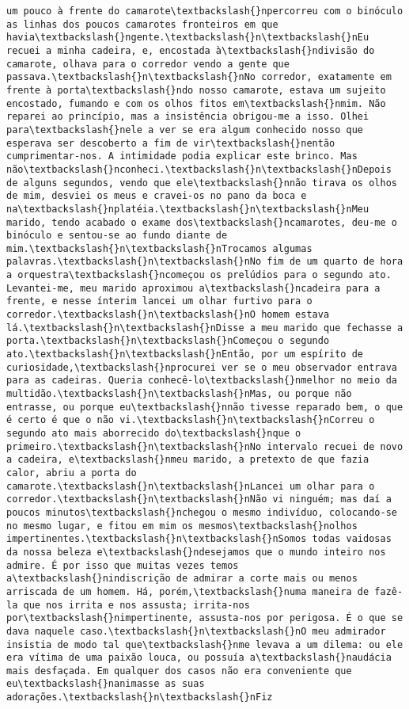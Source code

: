 \documentclass[11pt]{article}
\begin{document}
\begin{Verbatim}[commandchars=\\\{\}]
um pouco à frente do camarote\textbackslash{}npercorreu com o binóculo as linhas dos poucos camarotes fronteiros em que havia\textbackslash{}ngente.\textbackslash{}n\textbackslash{}nEu recuei a minha cadeira, e, encostada à\textbackslash{}ndivisão do camarote, olhava para o corredor vendo a gente que passava.\textbackslash{}n\textbackslash{}nNo corredor, exatamente em frente à porta\textbackslash{}ndo nosso camarote, estava um sujeito encostado, fumando e com os olhos fitos em\textbackslash{}nmim. Não reparei ao princípio, mas a insistência obrigou-me a isso. Olhei para\textbackslash{}nele a ver se era algum conhecido nosso que esperava ser descoberto a fim de vir\textbackslash{}nentão cumprimentar-nos. A intimidade podia explicar este brinco. Mas não\textbackslash{}nconheci.\textbackslash{}n\textbackslash{}nDepois de alguns segundos, vendo que ele\textbackslash{}nnão tirava os olhos de mim, desviei os meus e cravei-os no pano da boca e na\textbackslash{}nplatéia.\textbackslash{}n\textbackslash{}nMeu marido, tendo acabado o exame dos\textbackslash{}ncamarotes, deu-me o binóculo e sentou-se ao fundo diante de mim.\textbackslash{}n\textbackslash{}nTrocamos algumas palavras.\textbackslash{}n\textbackslash{}nNo fim de um quarto de hora a orquestra\textbackslash{}ncomeçou os prelúdios para o segundo ato. Levantei-me, meu marido aproximou a\textbackslash{}ncadeira para a frente, e nesse ínterim lancei um olhar furtivo para o corredor.\textbackslash{}n\textbackslash{}nO homem estava lá.\textbackslash{}n\textbackslash{}nDisse a meu marido que fechasse a porta.\textbackslash{}n\textbackslash{}nComeçou o segundo ato.\textbackslash{}n\textbackslash{}nEntão, por um espírito de curiosidade,\textbackslash{}nprocurei ver se o meu observador entrava para as cadeiras. Queria conhecê-lo\textbackslash{}nmelhor no meio da multidão.\textbackslash{}n\textbackslash{}nMas, ou porque não entrasse, ou porque eu\textbackslash{}nnão tivesse reparado bem, o que é certo é que o não vi.\textbackslash{}n\textbackslash{}nCorreu o segundo ato mais aborrecido do\textbackslash{}nque o primeiro.\textbackslash{}n\textbackslash{}nNo intervalo recuei de novo a cadeira, e\textbackslash{}nmeu marido, a pretexto de que fazia calor, abriu a porta do camarote.\textbackslash{}n\textbackslash{}nLancei um olhar para o corredor.\textbackslash{}n\textbackslash{}nNão vi ninguém; mas daí a poucos minutos\textbackslash{}nchegou o mesmo indivíduo, colocando-se no mesmo lugar, e fitou em mim os mesmos\textbackslash{}nolhos impertinentes.\textbackslash{}n\textbackslash{}nSomos todas vaidosas da nossa beleza e\textbackslash{}ndesejamos que o mundo inteiro nos admire. É por isso que muitas vezes temos a\textbackslash{}nindiscrição de admirar a corte mais ou menos arriscada de um homem. Há, porém,\textbackslash{}numa maneira de fazê-la que nos irrita e nos assusta; irrita-nos por\textbackslash{}nimpertinente, assusta-nos por perigosa. É o que se dava naquele caso.\textbackslash{}n\textbackslash{}nO meu admirador insistia de modo tal que\textbackslash{}nme levava a um dilema: ou ele era vítima de uma paixão louca, ou possuía a\textbackslash{}naudácia mais desfaçada. Em qualquer dos casos não era conveniente que eu\textbackslash{}nanimasse as suas adorações.\textbackslash{}n\textbackslash{}nFiz 
\end{Verbatim}
\end{document}
